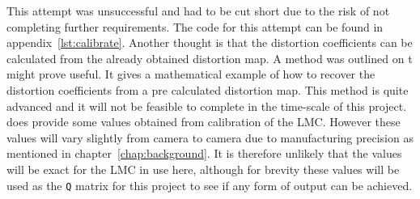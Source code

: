 \documentclass[11pt,oneside]{report}
\newcommand\code[1]{\texttt{#1}}
\begin{document}
			This attempt was unsuccessful and had to be cut short due to the risk of not completing further requirements.
			The code for this attempt can be found in appendix~\ref{lst:calibrate}.
			Another thought is that the distortion coefficients can be calculated from the already obtained distortion map.
			A method was outlined on t might prove useful.
			It gives a mathematical example of how to recover the distortion coefficients from a pre calculated distortion map.
			This method is quite advanced and it will not be feasible to complete in the time-scale of this project.
			 does provide some values obtained from calibration of the LMC.
			However these values will vary slightly from camera to camera due to manufacturing precision as mentioned in chapter~\ref{chap:background}.
			It is therefore unlikely that the values will be exact for the LMC in use here, although for brevity these values will be used as the \code{Q} matrix for this project to see if any form of output can be achieved.
\end{document}
